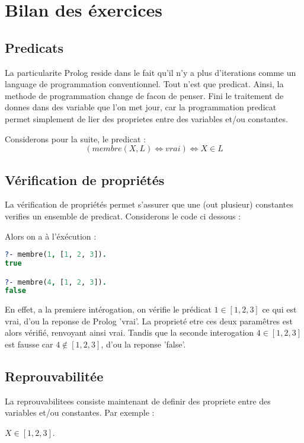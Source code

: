 
\chapter{Bilan des éxercices}

\section{Predicats}

La particularite Prolog reside dans le fait qu'il n'y a plus d'iterations comme
un language de programmation conventionnel. Tout n'est que predicat. Ainsi, la
methode de programmation change de facon de penser. Fini le traitement de donnes
dans des variable que l'on met jour, car la programmation predicat permet
simplement de lier des proprietes entre des variables et/ou constantes.

Considerons pour la suite, le predicat :
\[(membre(X, L) \Leftrightarrow vrai) \Leftrightarrow X \in L\]


\section{Vérification de propriétés}

La vérification de propriétés permet s'assurer que une (out plusieur) constantes
verifies un ensemble de predicat. Considerons le code ci dessous :

Alors on a à l'éxécution :

\begin{lstlisting}[language=Prolog]
?- membre(1, [1, 2, 3]).
true

?- membre(4, [1, 2, 3]).
false
\end{lstlisting}

En effet, a la premiere intérogation, on vérifie le prédicat $1 \in [1, 2, 3]$
ce qui est vrai, d'ou la reponse de Prolog 'vrai'. La proprieté etre ces deux
paramêtres est alors vérifié, renvoyant ainsi vrai. Tandis que la seconde
interogation $4 \in [1, 2, 3]$ est fausse car $4 \notin [1, 2, 3]$, d'ou la
reponse 'false'.


\section{Reprouvabilitée}

La reprouvabilitees consiste maintenant de definir des propriete entre des
variables et/ou constantes. Par exemple :
\begin{center}
$X \in [1, 2, 3]$.
\end{center}

